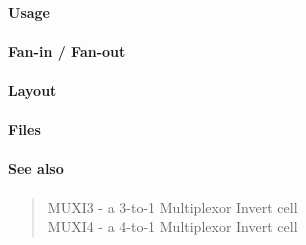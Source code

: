 \paragraph{Usage}

\paragraph{Fan-in / Fan-out}

\paragraph{Layout}

\paragraph{Files}
%

\paragraph{See also}
\begin{quote}
    MUXI3 - a 3-to-1 Multiplexor Invert cell \\
    MUXI4 - a 4-to-1 Multiplexor Invert cell
\end{quote}
